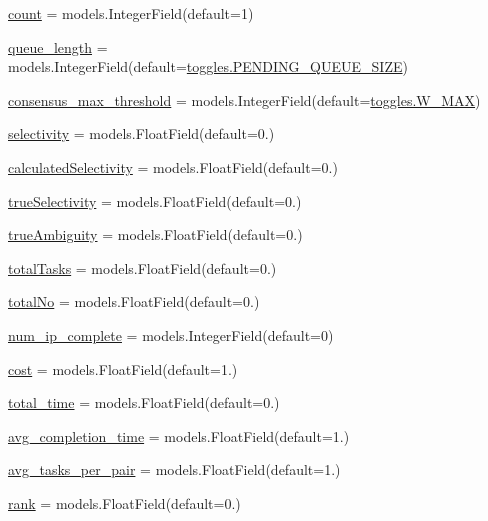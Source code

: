 \begin{DoxyCompactItemize}
\hyperlink{classdynamicfilterapp_1_1models_1_1_predicate_ae11b3deb3de3df7dc48e439074023e35}{count} = models.\+Integer\+Field(default=1)
\item 
\hyperlink{classdynamicfilterapp_1_1models_1_1_predicate_a1bdc57110df8b3c72e240a7f100b4096}{queue\+\_\+length} = models.\+Integer\+Field(default=\hyperlink{namespacedynamicfilterapp_1_1toggles_a642cb0e1f266db761b270ea65af5425a}{toggles.\+P\+E\+N\+D\+I\+N\+G\+\_\+\+Q\+U\+E\+U\+E\+\_\+\+S\+I\+ZE})
\item 
\hyperlink{classdynamicfilterapp_1_1models_1_1_predicate_a8bd4e3573ed7514dc98a1615fe047c23}{consensus\+\_\+max\+\_\+threshold} = models.\+Integer\+Field(default=\hyperlink{namespacedynamicfilterapp_1_1toggles_add63171ca968cbd5ca4d60dfbf9a2746}{toggles.\+W\+\_\+\+M\+AX})
\item 
\hyperlink{classdynamicfilterapp_1_1models_1_1_predicate_af0e245c39a758c26c7eadd206d81ae15}{selectivity} = models.\+Float\+Field(default=0.)
\item 
\hyperlink{classdynamicfilterapp_1_1models_1_1_predicate_a188ea6f444715e91f6b9e0860893ed16}{calculated\+Selectivity} = models.\+Float\+Field(default=0.)
\item 
\hyperlink{classdynamicfilterapp_1_1models_1_1_predicate_ad83f72684951b87b2dc27c4e469b2bb5}{true\+Selectivity} = models.\+Float\+Field(default=0.)
\item 
\hyperlink{classdynamicfilterapp_1_1models_1_1_predicate_ac6b5e98e5c2a0c3bbb3ff3e84ed67248}{true\+Ambiguity} = models.\+Float\+Field(default=0.)
\item 
\hyperlink{classdynamicfilterapp_1_1models_1_1_predicate_a21e1aac4555eeb991df1ae938abbcfd8}{total\+Tasks} = models.\+Float\+Field(default=0.)
\item 
\hyperlink{classdynamicfilterapp_1_1models_1_1_predicate_a4dc8ddca0ad5a5c301c4ad4245ba4466}{total\+No} = models.\+Float\+Field(default=0.)
\item 
\hyperlink{classdynamicfilterapp_1_1models_1_1_predicate_a6cd98dfddbfd6b4ac23a1db75792da3c}{num\+\_\+ip\+\_\+complete} = models.\+Integer\+Field(default=0)
\item 
\hyperlink{classdynamicfilterapp_1_1models_1_1_predicate_a6ce3360f2586a441b79b1053cfd2769c}{cost} = models.\+Float\+Field(default=1.)
\item 
\hyperlink{classdynamicfilterapp_1_1models_1_1_predicate_ae4ca52b9abe06f0013a84e7b33cf30ff}{total\+\_\+time} = models.\+Float\+Field(default=0.)
\item 
\hyperlink{classdynamicfilterapp_1_1models_1_1_predicate_a2f52b3007bbd1aa958220863bec30b0e}{avg\+\_\+completion\+\_\+time} = models.\+Float\+Field(default=1.)
\item 
\hyperlink{classdynamicfilterapp_1_1models_1_1_predicate_a6d5659d7cb67dfb46915ea0ff9c3d0e5}{avg\+\_\+tasks\+\_\+per\+\_\+pair} = models.\+Float\+Field(default=1.)
\item 
\hyperlink{classdynamicfilterapp_1_1models_1_1_predicate_aab463cca26e853227a05587642f8e578}{rank} = models.\+Float\+Field(default=0.)
\end{DoxyCompactItemize}
